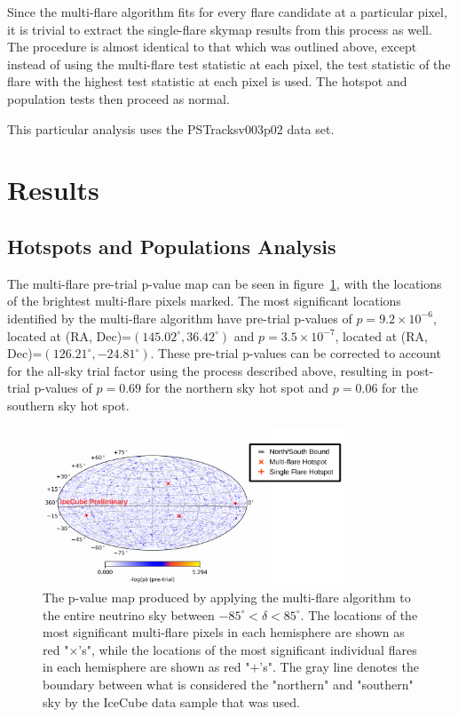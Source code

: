 Since the multi-flare algorithm fits for every flare candidate at a particular pixel, it is trivial to extract the single-flare skymap results from this process as well. The procedure is almost identical to that which was outlined above, except instead of using the multi-flare test statistic at each pixel, the test statistic of the flare with the highest test statistic at each pixel is used. The hotspot and population tests then proceed as normal.

This particular analysis uses the PSTracksv003p02 data set.

\section{Results}
\subsection{Hotspots and Populations Analysis}
The multi-flare pre-trial p-value map can be seen in figure~\ref{fig:mfskymap}, with the locations of the brightest multi-flare pixels marked. The most significant locations identified by the multi-flare algorithm have pre-trial p-values of $p=9.2\times10^{-6}$, located at (RA, Dec)=$(145.02^{\circ}, 36.42^{\circ})$ and $p=3.5\times10^{-7}$, located at (RA, Dec)=$(126.21^{\circ}, -24.81^{\circ})$. These pre-trial p-values can be corrected to account for the all-sky trial factor using the process described above, resulting in post-trial p-values of $p=0.69$ for the northern sky hot spot and $p=0.06$ for the southern sky hot spot.

\begin{figure}[h]
\centering
\includegraphics[width=0.8\textwidth]{figs/skymap_withlabels.png}
\caption{The p-value map produced by applying the multi-flare algorithm to the entire neutrino sky between $-85^{\circ}<\delta<85^{\circ}$. The locations of the most significant multi-flare pixels in each hemisphere are shown as red "$\times$'s", while the locations of the most significant individual flares in each hemisphere are shown as red "$+$'s". The gray line denotes the boundary between what is considered the "northern" and "southern" sky by the IceCube data sample that was used. }
\label{fig:mfskymap}
\end{figure}

